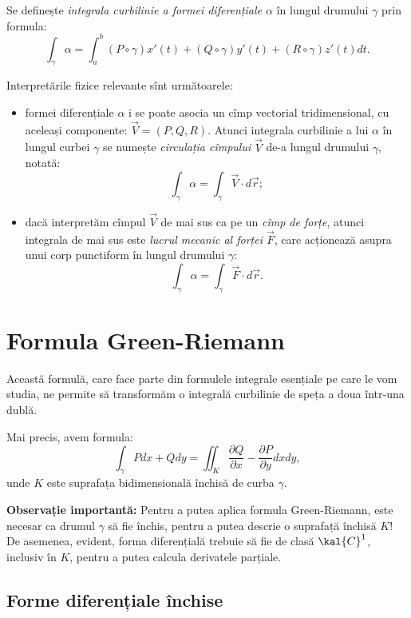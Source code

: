 Se definește \emph{integrala curbilinie a formei diferențiale $ \alpha $}
în lungul drumului $ \gamma $ prin formula:
\[
  \int_\gamma \alpha = \int_a^b (P \circ \gamma) x'(t) + (Q \circ \gamma) y'(t) + %
  (R \circ \gamma) z'(t) dt.
\]

Interpretările fizice relevante sînt următoarele:
\begin{itemize}
\item formei diferențiale $ \alpha $ i se poate asocia un cîmp vectorial tridimensional,
  cu aceleași componente: $ \vec{V} = (P, Q, R) $. Atunci integrala curbilinie a
  lui $ \alpha $ în lungul curbei $ \gamma $ se numește \emph{circulația cîmpului}
  $ \vec{V}$ de-a lungul drumului $ \gamma $, notată:
  \[
    \int_\gamma \alpha = \int_\gamma \vec{V} \cdot d\vec{r};
  \]
\item dacă interpretăm cîmpul $ \vec{V} $ de mai sus ca pe un \emph{cîmp de forțe},
  atunci integrala de mai sus este \emph{lucrul mecanic al forței $ \vec{F} $},
  care acționează asupra unui corp punctiform în lungul drumului $ \gamma $:
  \[
    \int_\gamma \alpha = \int_\gamma \vec{F} \cdot d\vec{r}.
  \]
\end{itemize}


\section{Formula Green-Riemann}

Această formulă, care face parte din formulele integrale esențiale pe care
le vom studia, ne permite să transformăm o integrală curbilinie de speța a doua
într-una dublă.

Mai precis, avem formula:
\[
  \int_\gamma Pdx + Qdy = %
  \iint_K \frac{\partial Q}{\partial x} - \frac{\partial P}{\partial y} dxdy,
\]
unde $ K $ este suprafața bidimensională închisă de curba $ \gamma $.

\textbf{Observație importantă:} Pentru a putea aplica formula Green-Riemann,
este necesar ca drumul $ \gamma $ să fie închis, pentru a putea descrie
o suprafață închisă $ K $! De asemenea, evident, forma diferențială trebuie
să fie de clasă $ \kal{C}^1 $, inclusiv în $ K $, pentru a putea calcula
derivatele parțiale.

\subsection{Forme diferențiale închise}

